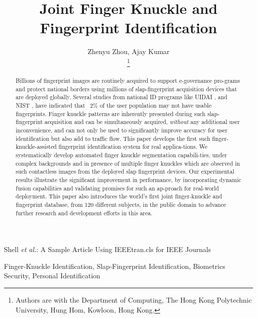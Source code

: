 \documentclass[lettersize, journal]{IEEEtran}
\begin{document}
\title{Joint Finger Knuckle and Fingerprint Identification}

\author{{Zhenyu Zhou, Ajay Kumar}

\thanks{Authors are with the Department of Computing, The Hong Kong Polytechnic University, Hung Hom, Kowloon, Hong Kong.}}

%
{Shell \MakeLowercase{\textit{et al.}}: A Sample Article Using IEEEtran.cls for IEEE Journals}

\maketitle

\begin{abstract}
  Billions of fingerprint images are routinely acquired to support e-governance pro-grams and protect national borders using millions of slap-fingerprint acquisition devices that are deployed globally. Several studies from national ID programs like UIDAI \cite{uidai}, and NIST \cite{2002SUMMARYON}, have indicated that ~2\% of the user population may not have usable fingerprints. Finger knuckle patterns are inherently presented during such slap-fingerprint acquisition and can be simultaneously acquired, \textit{without} any additional user inconvenience, and can not only be used to significantly improve accuracy for user identification but also add to traffic flow. This paper develops the first such finger-knuckle-assisted fingerprint identification system for real applica-tions. We systematically develop automated finger knuckle segmentation capabili-ties, under complex backgrounds and in presence of multiple finger knuckles which are observed in such contactless images from the deployed slap fingerprint devices. Our experimental results illustrate the significant improvement in performance, by incorporating dynamic fusion capabilities and validating promises for such an ap-proach for real-world deployment. This paper also introduces the world’s first joint finger-knuckle and fingerprint database, from 120 different subjects, in the public domain to advance further research and development efforts in this area.

\end{abstract}

\begin{IEEEkeywords}
  Finger-Knuckle Identification, Slap-Fingerprint Identification, Biometrics Security, Personal Identification
\end{IEEEkeywords}
\end{document}
